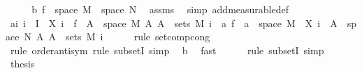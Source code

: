 \begin{isabellebody}
%
\isadelimproof
%
\endisadelimproof
%
\isatagproof
{}\isamarkupfalse%
\ {\isacharminus}{\kern0pt}\isanewline
\ \ \isamarkupfalse%
\ b{}{\isacharcolon}{\kern0pt}\ {\isachardoublequoteopen}f\ {\isasymin}\ space\ M\ {\isasymrightarrow}\ space\ N{\isachardoublequoteclose}\ \isamarkupfalse%
\ assms{\isacharparenleft}{\kern0pt}{}{\isacharparenright}{\kern0pt}\ \isamarkupfalse%
\ {\isacharparenleft}{\kern0pt}simp\ add{\isacharcolon}{\kern0pt}measurable{\isacharunderscore}{\kern0pt}def{\isacharparenright}{\kern0pt}\isanewline
\ \ \isamarkupfalse%
\ a{\isacharcolon}{\kern0pt}{\isachardoublequoteopen}{\isasymAnd}i{\isachardot}{\kern0pt}\ i\ {\isasymin}\ I\ {\isasymLongrightarrow}\ {\isacharbraceleft}{\kern0pt}{\isacharparenleft}{\kern0pt}X{\isacharprime}{\kern0pt}\ i\ {\isasymcirc}\ f{\isacharparenright}{\kern0pt}\ {\isacharminus}{\kern0pt}{\isacharbackquote}{\kern0pt}\ A\ {\isasyminter}\ space\ M\ {\isacharbar}{\kern0pt}A{\isachardot}{\kern0pt}\ A\ {\isasymin}\ sets\ {\isacharparenleft}{\kern0pt}M{\isacharprime}{\kern0pt}\ i{\isacharparenright}{\kern0pt}{\isacharbraceright}{\kern0pt}\ {\isacharequal}{\kern0pt}\ {\isacharparenleft}{\kern0pt}{\isasymlambda}a{\isachardot}{\kern0pt}\ f\ {\isacharminus}{\kern0pt}{\isacharbackquote}{\kern0pt}\ a\ {\isasyminter}\ space\ M{\isacharparenright}{\kern0pt}\ {\isacharbackquote}{\kern0pt}\ {\isacharbraceleft}{\kern0pt}X{\isacharprime}{\kern0pt}\ i\ {\isacharminus}{\kern0pt}{\isacharbackquote}{\kern0pt}\ A\ {\isasyminter}\ space\ N\ {\isacharbar}{\kern0pt}A{\isachardot}{\kern0pt}\ A\ {\isasymin}\ sets\ {\isacharparenleft}{\kern0pt}M{\isacharprime}{\kern0pt}\ i{\isacharparenright}{\kern0pt}{\isacharbraceright}{\kern0pt}{\isachardoublequoteclose}\isanewline
\ \ \ \ \isamarkupfalse%
\ {\isacharparenleft}{\kern0pt}rule\ set{\isacharunderscore}{\kern0pt}comp{\isacharunderscore}{\kern0pt}cong{\isacharparenright}{\kern0pt}\isanewline
\ \ \ \ \isamarkupfalse%
\ {\isacharparenleft}{\kern0pt}rule\ order{\isacharunderscore}{\kern0pt}antisym{\isacharcomma}{\kern0pt}\ rule\ subsetI{\isacharcomma}{\kern0pt}\ simp{\isacharparenright}{\kern0pt}\ \isamarkupfalse%
\ b{}\ \isamarkupfalse%
\ fast\isanewline
\ \ \ \ \isamarkupfalse%
\ {\isacharparenleft}{\kern0pt}rule\ subsetI{\isacharcomma}{\kern0pt}\ simp{\isacharparenright}{\kern0pt}\ \isanewline
\ \ \isamarkupfalse%
\ {\isacharquery}{\kern0pt}thesis\ \isanewline
\ \ \isamarkupfalse%

\end{isabellebody}
